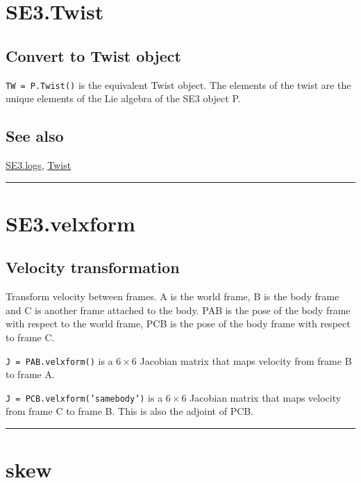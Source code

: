 \hypertarget{SE3.Twist}{\section*{SE3.Twist}}
\subsection*{Convert to Twist object}


\texttt{TW = P.Twist()} is the equivalent Twist object.  The elements of the twist are the unique
elements of the Lie algebra of the SE3 object P.


\subsection*{See also}


\hyperlink{SE3.logs}{\color{blue} SE3.logs}, \hyperlink{Twist}{\color{blue} Twist}

\vspace{1.5ex}\hrule

\hypertarget{SE3.velxform}{\section*{SE3.velxform}}
\subsection*{Velocity transformation}


Transform velocity between frames.  A is the world frame, B is the body
frame and C is another frame attached to the body.  PAB is the pose of
the body frame with respect to the world frame, PCB is the pose of the
body frame with respect to frame C.



\texttt{J = PAB.velxform()} is a $6 \times 6$ Jacobian matrix that maps velocity from frame
B to frame A.



\texttt{J = PCB.velxform('samebody')} is a $6 \times 6$ Jacobian matrix that maps velocity
from frame C to frame B.  This is also the adjoint of PCB.

\vspace{1.5ex}\rule{\textwidth}{1mm}

\hypertarget{skew}{\section*{skew}}
